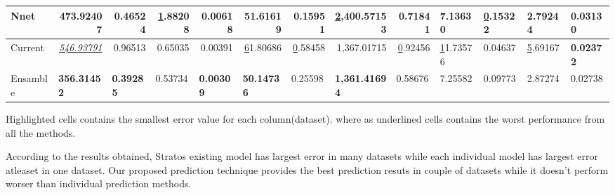 \begin{table}[]
\begin{tabular}{@{}|l|r|r|r|r|r|r|r|r|l|l|l|l|@{}}
Nnet                                         & 473.92407                               & 0.46524                               & {\ul 1.88208}                & 0.00618                               & 51.61619                               & \textbf{0.15951}             & {\ul 2,400.57153}                         & 0.71841                      & \textbf{7.13630} & {\ul 0.15322}    & \textbf{2.79244} & 0.03130          \\ \midrule
Current                                      & {\ul \textit{546.93791}}                & 0.96513                               & 0.65035                      & 0.00391                               & {\ul 61.80686}                         & {\ul 0.58458}                & 1,367.01715                               & {\ul 0.92456}                & {\ul 11.73576}   & 0.04637          & {\ul 5.69167}    & \textbf{0.02372} \\ \midrule
Ensamble                                     & \multicolumn{1}{l|}{\textbf{356.31452}} & \multicolumn{1}{l|}{\textbf{0.39285}} & \multicolumn{1}{l|}{0.53734} & \multicolumn{1}{l|}{\textbf{0.00309}} & \multicolumn{1}{l|}{\textbf{50.14736}} & \multicolumn{1}{l|}{0.25598} & \multicolumn{1}{l|}{\textbf{1,361.41694}} & \multicolumn{1}{l|}{0.58676} & 7.25582          & 0.09773          & 2.87274          & 0.02738          \\ \bottomrule
\end{tabular}
\end{table}

Highlighted cells contains the smallest error value for each column(dataset). where as underlined cells contains the worst performance from all the methods. 

According to the results obtained, Stratos existing model has largest error in many datasets while each individual model has largest error atleaset in one dataset. Our proposed prediction technique provides the best prediction resuts in couple of datasets while it doesn't perform worser than individual prediction methods. 
